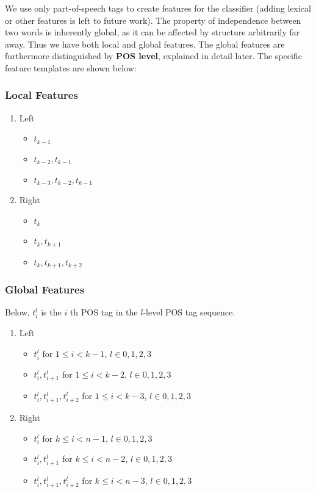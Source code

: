 \documentclass[11pt]{article}
\begin{document}
We use only part-of-speech tags to create features for the classifier
(adding lexical or other features is left to future work). The
property of independence between two words is inherently global, as it
can be affected by structure arbitrarily far away. Thus we have both
local and global features. The global features are furthermore
distinguished by \textbf{POS level}, explained in detail later. The specific
feature templates are shown below:

\subsubsection{Local Features}
\label{sec-4-1-1}
\begin{enumerate}
\item Left
\label{sec-4-1-1-1}
\begin{itemize}
\item $t_{k-1}$
\item $t_{k-2},t_{k-1}$
\item $t_{k-3},t_{k-2},t_{k-1}$
\end{itemize}

\item Right
\label{sec-4-1-1-2}
\begin{itemize}
\item $t_{k}$
\item $t_{k},t_{k+1}$
\item $t_{k},t_{k+1},t_{k+2}$
\end{itemize}
\end{enumerate}

\subsubsection{Global Features}
\label{sec-4-1-2}

Below, $t^{l}_{i}$ is the $i$ th POS tag in the $l$-level POS tag sequence.

\begin{enumerate}
\item Left
\label{sec-4-1-2-1}
\begin{itemize}
\item $t^l_{i}$ for $1 \le i < k - 1$, $l \in {0,1,2,3}$
\item $t^l_{i},t^l_{i+1}$ for $1 \le i < k - 2$, $l \in {0,1,2,3}$
\item $t^l_{i},t^l_{i+1},t^l_{i+2}$ for $1 \le i < k - 3$, $l \in {0,1,2,3}$
\end{itemize}

\item Right
\label{sec-4-1-2-2}
\begin{itemize}
\item $t^l_{i}$ for $k \le i < n - 1$, $l \in {0,1,2,3}$
\item $t^l_{i},t^l_{i+1}$ for $k \le i < n - 2$, $l \in {0,1,2,3}$
\item $t^l_{i},t^l_{i+1},t^l_{i+2}$ for $k \le i < n - 3$, $l \in {0,1,2,3}$
\end{itemize}
\end{enumerate}
\end{document}
